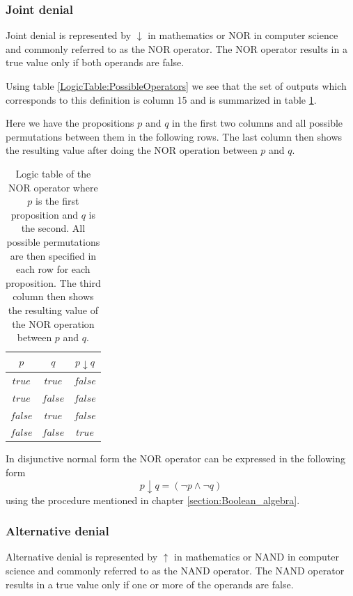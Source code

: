     \subsubsection{Joint denial}
        Joint denial is represented by $\downarrow$ in mathematics or NOR in computer science and commonly referred to as the NOR operator. The NOR operator results in a true value only if both operands are false.
        
        Using table \ref{LogicTable:PossibleOperators} we see that the set of outputs which corresponds to this definition is column 15 and is summarized in table \ref{LogicTable:NOR}.
        
        Here we have the propositions $p$ and $q$ in the first two columns and all possible permutations between them in the following rows. The last column then shows the resulting value after doing the NOR operation between $p$ and $q$.
        
        \begin{table}[h!]
            \centering
            \begin{tabular}{|c|c|c|}
            	\hline
            	  $p$   &   $q$   & $p \downarrow q$ \\ \hline
            	$true$  & $true$  &     $false$      \\ \hline
            	$true$  & $false$ &     $false$      \\ \hline
            	$false$ & $true$  &     $false$      \\ \hline
            	$false$ & $false$ &      $true$      \\ \hline
            \end{tabular}
            \caption{Logic table of the NOR operator where $p$ is the first proposition and $q$ is the second. All possible permutations are then specified in each row for each proposition. The third column then shows the resulting value of the NOR operation between $p$ and $q$.}
            \label{LogicTable:NOR}
        \end{table}
        
        In disjunctive normal form the NOR operator can be expressed in the following form
        \begin{equation}
            p \downarrow q = (\neg p \wedge \neg q)
        \end{equation}
        using the procedure mentioned in chapter \ref{section:Boolean_algebra}.
    
    \subsubsection{Alternative denial}
        Alternative denial is represented by $\uparrow$ in mathematics or NAND in computer science and commonly referred to as the NAND operator. The NAND operator results in a true value only if one or more of the operands are false.
        
